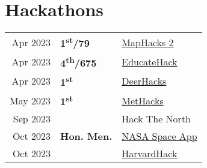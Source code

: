 
\section{Hackathons}
\begin{tabular}{rll}
  Apr 2023 & \bf{1\textsuperscript{st}/79}  & \href{https://devpost.com/software/tbd-p9xqhv}{MapHacks 2}                                        \\
  Apr 2023 & \bf{4\textsuperscript{th}/675} & \href{https://devpost.com/software/hackthefeed-1ycujf}{EducateHack}                               \\
  Apr 2023 & \bf{1\textsuperscript{st}}     & \href{https://devpost.com/software/tba-z5dkvc}{DeerHacks}                                         \\
  May 2023 & \bf{1\textsuperscript{st}}     & \href{https://devpost.com/software/tba-asjk6y}{MetHacks}                                          \\
  Sep 2023 &                                & Hack The North                                                                                    \\
  Oct 2023 & \bf{Hon. Men.}                 & \href{https://www.spaceappschallenge.org/2023/find-a-team/intergalactic-pirates/}{NASA Space App} \\
  Oct 2023 &                                & \href{https://devpost.com/software/dataplace}{HarvardHack}                                        \\
\end{tabular}
\sectionsep